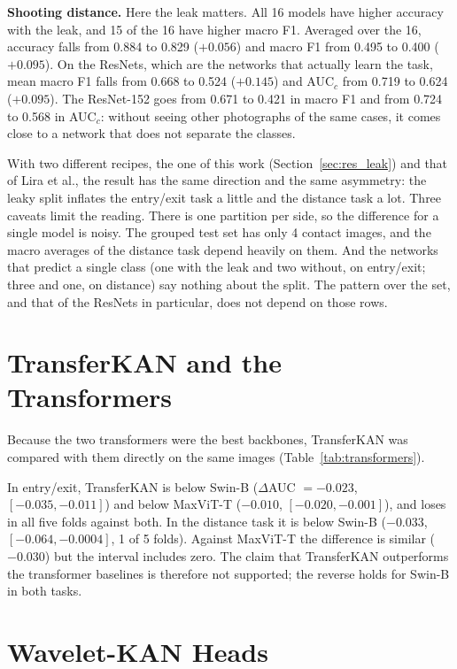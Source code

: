 

\textbf{Shooting distance.} Here the leak matters. All 16 models have higher accuracy with the leak, and 15 of the 16 have higher macro F1. Averaged over the 16, accuracy falls from 0.884 to 0.829 ($+0.056$) and macro F1 from 0.495 to 0.400 ($+0.095$). On the ResNets, which are the networks that actually learn the task, mean macro F1 falls from 0.668 to 0.524 ($+0.145$) and AUC$_c$ from 0.719 to 0.624 ($+0.095$). The ResNet-152 goes from 0.671 to 0.421 in macro F1 and from 0.724 to 0.568 in AUC$_c$: without seeing other photographs of the same cases, it comes close to a network that does not separate the classes.

With two different recipes, the one of this work (Section~\ref{sec:res_leak}) and that of Lira et al., the result has the same direction and the same asymmetry: the leaky split inflates the entry/exit task a little and the distance task a lot. Three caveats limit the reading. There is one partition per side, so the difference for a single model is noisy. The grouped test set has only 4 contact images, and the macro averages of the distance task depend heavily on them. And the networks that predict a single class (one with the leak and two without, on entry/exit; three and one, on distance) say nothing about the split. The pattern over the set, and that of the ResNets in particular, does not depend on those rows.

\section{TransferKAN and the Transformers}
\label{sec:res_transformers}

Because the two transformers were the best backbones, TransferKAN was compared with them directly on the same images (Table~\ref{tab:transformers}).



In entry/exit, TransferKAN is below Swin-B ($\Delta$AUC $= -0.023$, $[-0.035, -0.011]$) and below MaxViT-T ($-0.010$, $[-0.020, -0.001]$), and loses in all five folds against both. In the distance task it is below Swin-B ($-0.033$, $[-0.064, -0.0004]$, 1 of 5 folds). Against MaxViT-T the difference is similar ($-0.030$) but the interval includes zero. The claim that TransferKAN outperforms the transformer baselines is therefore not supported; the reverse holds for Swin-B in both tasks.

\section{Wavelet-KAN Heads}
\label{sec:res_wavkan}

